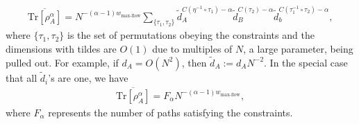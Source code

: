 \documentclass[a4paper,11pt]{article}
\newcommand{\Tr}{\text{Tr}}
\newcommand*{\JKF}[1]{\textcolor{blue}{[JKF: #1]}}
\newcommand*{\SR}[1]{\textcolor{magenta}{[SR: \textsf{#1}]}}
\begin{document}
\begin{align}
    \overline{\Tr\left[ \rho_A^{\alpha}\right]} =N^{ - (\alpha-1) w_{\text{max-flow}} } \sum_{\{\tau_1,\tau_2\}} \tilde{d}_A^{C(\eta^{-1}\circ \tau_1)-\alpha} \tilde{d}_B^{C(\tau_2)-\alpha}\tilde{d}_b^{C(\tau_1^{-1} \circ \tau_2)-\alpha},
    \label{network_eq}
\end{align}
where $\{ \tau_1,\tau_2\}$ is the set of permutations obeying the constraints and the dimensions with tildes are $O(1)$ due to multiples of $N$, a large parameter, being pulled out. For example, if $d_A = O(N^2)$, then $\tilde{d}_A := d_A N^{-2}$. In the special case that all $\tilde{d}_i$'s are one, we have
\begin{align}
    \overline{\Tr\left[ \rho_A^{\alpha}\right]} =F_{\alpha}N^{ - (\alpha-1) w_{\text{max-flow}} } ,
    \label{network_eq_special}
\end{align}
where $F_{\alpha}$ represents the number of paths satisfying the constraints. 
\end{document}
